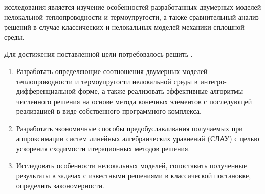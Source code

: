 

{\aim} исследования является изучение особенностей разработанных двумерных моделей нелокальной теплопроводности и термоупругости, а также сравнительный анализ решений в случае классических и нелокальных моделей механики сплошной среды.

Для достижения поставленной цели потребовалось решить {\tasks}.
\begin{enumerate}[beginpenalty=10000] %
  \item Разработать определяющие соотношения двумерных моделей теплопроводности и термоупругости нелокальной среды в интегро-дифференциальной форме, а также реализовать эффективные алгоритмы численного решения на основе метода конечных элементов с последующей реализацией в виде собственного программного комплекса.
  \item Разработать экономичные способы предобуславливания получаемых при аппроксимации систем линейных алгебраических уравнений (СЛАУ) с целью ускорения сходимости итерационных методов решения.
  \item Исследовать особенности нелокальных моделей, сопоставить полученные результаты в задачах с известными решениями в классической постановке, определить закономерности.
\end{enumerate}


